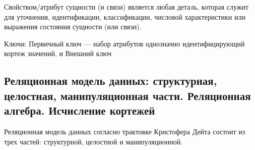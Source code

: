 Свойством/атрибут сущности (и связи) является любая деталь, которая служит для уточнения, идентификации, классификации, числовой характеристики или выражения состояния сущности (или связи).

Ключи: Первичный ключ --- набор атрибутов однозначно идентифицирующий кортеж значений, и Внешний ключ

\newpage

\subsection{Реляционная модель данных: структурная, целостная, манипуляционная части. Реляционная алгебра. Исчисление кортежей}

Реляционная модель данных согласно трактовке Кристофера Дейта состоит из трех частей: структурной, целостной и манипуляционной.

